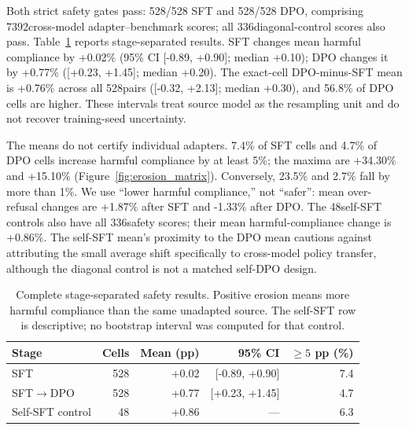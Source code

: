 \documentclass[letterpaper]{article}
\newcommand{\CampaignAdaptersPerStage}{528}
\newcommand{\SelfSFTAdapters}{48}
\newcommand{\CrossModelSafetyScores}{7392}
\newcommand{\SelfSFTSafetyScores}{336}
\newcommand{\SelfSFTMeanErosionPP}{+0.86}
\newcommand{\SelfSFTPctAtLeastFive}{6.3}
\newcommand{\SFTMeanErosionPP}{+0.02}
\newcommand{\DPOMeanErosionPP}{+0.77}
\newcommand{\SFTMeanErosionCI}{[-0.89, +0.90]}
\newcommand{\DPOMeanErosionCI}{[+0.23, +1.45]}
\newcommand{\SFTPctBelowMinusOne}{23.5}
\newcommand{\DPOPctBelowMinusOne}{2.7}
\newcommand{\SFTPctAtLeastFive}{7.4}
\newcommand{\DPOPctAtLeastFive}{4.7}
\newcommand{\SFTMedianErosionPP}{+0.10}
\newcommand{\DPOMedianErosionPP}{+0.20}
\newcommand{\SFTMaxErosionPP}{+34.30}
\newcommand{\DPOMaxErosionPP}{+15.10}
\newcommand{\SFTMeanOverRefusalDeltaPP}{+1.87}
\newcommand{\DPOMeanOverRefusalDeltaPP}{-1.33}
\newcommand{\PairedStageCells}{528}
\newcommand{\PairedStageDeltaPP}{+0.76}
\newcommand{\PairedStageDeltaCI}{[-0.32, +2.13]}
\newcommand{\PairedStageMedianPP}{+0.30}
\newcommand{\PairedStagePctDPOHigher}{56.8}
\begin{document}
Both strict safety gates pass: 528/528 SFT and 528/528 DPO, comprising
\CrossModelSafetyScores cross-model adapter--benchmark scores; all
\SelfSFTSafetyScores diagonal-control scores also pass. Table~\ref{tab:stages}
reports stage-separated results. SFT changes mean harmful compliance by
\SFTMeanErosionPP\% (95\% CI \SFTMeanErosionCI; median
\SFTMedianErosionPP); DPO changes it by \DPOMeanErosionPP\%
(\DPOMeanErosionCI; median \DPOMedianErosionPP). The exact-cell DPO-minus-SFT mean is
\PairedStageDeltaPP\% across all \PairedStageCells pairs (\PairedStageDeltaCI;
median \PairedStageMedianPP), and \PairedStagePctDPOHigher\% of DPO cells are higher.
These intervals treat source model as the resampling unit and do not recover
training-seed uncertainty.

The means do not certify individual adapters. \SFTPctAtLeastFive\% of SFT cells and
\DPOPctAtLeastFive\% of DPO cells increase harmful compliance by at least 5\%;
the maxima are \SFTMaxErosionPP\% and \DPOMaxErosionPP\% (Figure~\ref{fig:erosion_matrix}). Conversely,
\SFTPctBelowMinusOne\% and \DPOPctBelowMinusOne\% fall by more than 1\%. We use
``lower harmful compliance,'' not ``safer'': mean over-refusal changes are
\SFTMeanOverRefusalDeltaPP\% after SFT and \DPOMeanOverRefusalDeltaPP\% after DPO.
The \SelfSFTAdapters self-SFT controls also have all \SelfSFTSafetyScores safety scores;
their mean harmful-compliance change is \SelfSFTMeanErosionPP\%. The self-SFT mean's proximity to
the DPO mean cautions against attributing the small average shift specifically to
cross-model policy transfer, although the diagonal control is not a matched self-DPO design.

\begin{table}[t]
\centering
\small
\setlength{\tabcolsep}{2.5pt}
\begin{tabular}{lrrrr}
\toprule
Stage & Cells & Mean (pp) & 95\% CI & $\ge5$ pp (\%) \\
\midrule
SFT & \CampaignAdaptersPerStage & \SFTMeanErosionPP & \SFTMeanErosionCI & \SFTPctAtLeastFive \\
SFT$\rightarrow$DPO & \CampaignAdaptersPerStage & \DPOMeanErosionPP & \DPOMeanErosionCI & \DPOPctAtLeastFive \\
Self-SFT control & \SelfSFTAdapters & \SelfSFTMeanErosionPP & --- & \SelfSFTPctAtLeastFive \\
\bottomrule
\end{tabular}
\caption{Complete stage-separated safety results. Positive erosion means more harmful
compliance than the same unadapted source. The self-SFT row is descriptive; no
bootstrap interval was computed for that control.}
\label{tab:stages}
\end{table}
\end{document}
